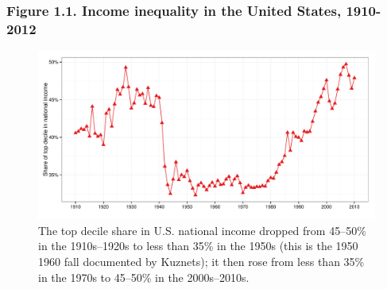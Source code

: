 \documentclass[t]{beamer}\usepackage[]{graphicx}\usepackage[]{color}
\newenvironment{knitrout}{}{} %
\begin{document}
\begin{frame}[label=Figure_1_1,fragile]
\frametitle{Figure 1.1. Income inequality in the United States, 1910-2012}
\begin{figure}[t]
\begin{minipage}[b]{\textwidth}
\centering
\begin{knitrout}\footnotesize
{}\color{fgcolor}

{\centering \includegraphics[width=1\linewidth]{figures/color/Figure_1_1} 

}



\end{knitrout}
\caption{The top decile share in U.S. national income dropped from 45--50\% in the 1910s--1920s to less than 35\% in the 1950s (this is the
1950 1960 fall documented by Kuznets); it then rose from less than 35\% in the 1970s to 45--50\% in the 2000s--2010s.}
\end{minipage}
\end{figure}
\end{frame}
\end{document}
